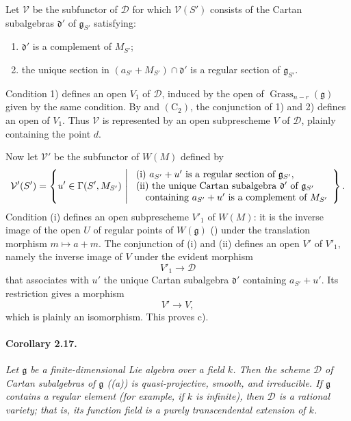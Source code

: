 Let \(\mathcal V\) be the subfunctor of \(\mathcal D\) for which
\(\mathcal V(S')\) consists of the Cartan subalgebras
\(\mathfrak d'\) of \(\mathfrak g_{S'}\) satisfying:
\begin{enumerate}
\item[\textup{1\textdegree)}]
  \(\mathfrak d'\) is a complement of \(M_{S'}\);
\item[\textup{2\textdegree)}]
  the unique section in
  \((a_{S'}+M_{S'})\cap\mathfrak d'\) is a regular section of
  \(\mathfrak g_{S'}\).
\end{enumerate}
Condition \textup{1\textdegree)} defines an open \(V_1\) of
\(\mathcal D\), induced by the open of
\(\operatorname{Grass}_{n-r}(\mathfrak g)\) given by the same
condition. By  and \((\mathrm C_2)\), the conjunction of
\textup{1\textdegree)} and \textup{2\textdegree)} defines an open
of \(V_1\). Thus \(\mathcal V\) is represented by an open
subprescheme \(V\) of \(\mathcal D\), plainly containing the point
\(d\).

Now let \(\mathcal V'\) be the subfunctor of \(W(M)\) defined by
\[
 \mathcal V'(S')
 =
 \left\{
   u'\in\Gamma(S',M_{S'})
   \ \middle|\
   \begin{array}{l}
   \textup{(i) }a_{S'}+u'\text{ is a regular section of }
     \mathfrak g_{S'},\\
   \textup{(ii) the unique Cartan subalgebra }\mathfrak d'
     \text{ of }\mathfrak g_{S'}\\
   \quad\text{containing }a_{S'}+u'
     \text{ is a complement of }M_{S'}
   \end{array}
 \right\}.
\]
Condition \textup{(i)} defines an open subprescheme \(V'_1\) of
\(W(M)\): it is the inverse image of the open \(U\) of regular
points of \(W(\mathfrak g)\) \textup{()} under the translation
morphism \(m\mapsto a+m\). The conjunction of \textup{(i)} and
\textup{(ii)} defines an open \(V'\) of \(V'_1\), namely the
inverse image of \(V\) under the evident morphism
\[
  V'_1\longrightarrow\mathcal D
\]
that associates with \(u'\) the unique Cartan subalgebra
\(\mathfrak d'\) containing \(a_{S'}+u'\). Its restriction gives
a morphism
\[
  V'\longrightarrow V,
\]
which is plainly an isomorphism. This proves \textup{c)}.

\paragraph{\textbf{Corollary 2.17.}}
{\itshape Let \(\mathfrak g\) be a finite-dimensional Lie algebra
over a field \(k\). Then the scheme \(\mathcal D\) of Cartan
subalgebras of \(\mathfrak g\) \textup{(\textup{(a)})} is
quasi-projective, smooth, and irreducible. If \(\mathfrak g\)
contains a regular element \textup{(for example, if \(k\) is
infinite)}, then \(\mathcal D\) is a rational variety; that is, its
function field is a purely transcendental extension of \(k\).}

